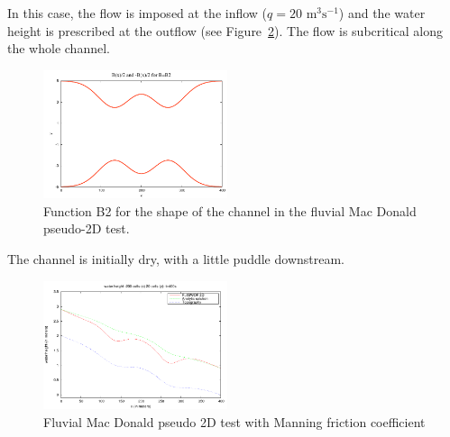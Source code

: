 \documentclass[a4paper, 11pt]{article}
\begin{document}
In this case, the flow is imposed at the inflow ($q=20\text{ m}^3 \text{s}^{-1}$) and the water height is prescribed at the outflow (see Figure~\ref{Figpseudo2D_flu}). The flow is subcritical along the whole channel.
\begin{figure}[htbp]
  \begin{center}
    \includegraphics[width=0.48\textwidth]{Figures_FullSWOF_2D/MacDonald_b2}
    \caption{Function B2 for the shape of the channel in the fluvial Mac Donald pseudo-2D test.}
    \label{Figpseudo2D_flu_b2}
  \end{center}
\end{figure}

The channel is initially dry, with a little puddle downstream.

\begin{figure}[htbp]
  \begin{center}
    \includegraphics[width=0.48\textwidth]{Figures_FullSWOF_2D/MacDoP2D_flu_Man_h}
    \caption{Fluvial Mac Donald  pseudo 2D test with Manning friction coefficient}
    \label{Figpseudo2D_flu}
  \end{center}
\end{figure}
\end{document}
